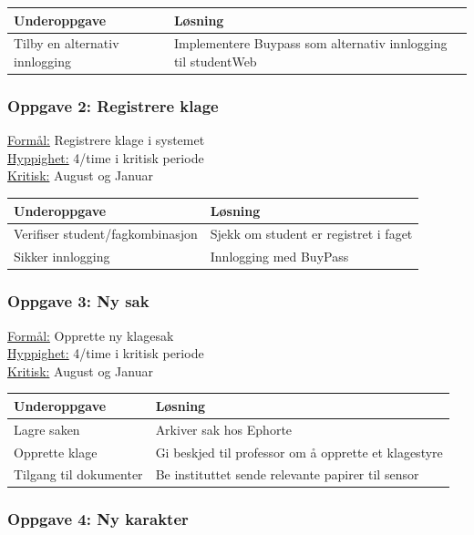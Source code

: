 \documentclass[12pt]{article}
\begin{document}
\begin{tabularx}{\textwidth}{|l|X|}
  \hline
  Underoppgave & Løsning \\ \hline
  Tilby en alternativ innlogging & Implementere Buypass som alternativ innlogging til studentWeb \\ \hline
\end{tabularx}

\subsubsection*{Oppgave 2: Registrere klage}

\underline{Formål:} Registrere klage i systemet\\
\underline{Hyppighet:} 4/time i kritisk periode\\
\underline{Kritisk:} August og Januar

\begin{tabularx}{\textwidth}{|l|X|}
  \hline
  Underoppgave & Løsning \\ \hline
  Verifiser student/fagkombinasjon & Sjekk om student er registret i faget \\ \hline
  Sikker innlogging & Innlogging med BuyPass \\ \hline
\end{tabularx}


\subsubsection*{Oppgave 3: Ny sak}

\underline{Formål:} Opprette ny klagesak\\
\underline{Hyppighet:} 4/time i kritisk periode\\
\underline{Kritisk:} August og Januar

\begin{tabularx}{\textwidth}{|l|X|}
  \hline
  Underoppgave & Løsning \\ \hline
  Lagre saken & Arkiver sak hos Ephorte \\ \hline
  Opprette klage & Gi beskjed til professor om å opprette et klagestyre \\ \hline
  Tilgang til dokumenter & Be instituttet sende relevante papirer til sensor \\ \hline
\end{tabularx}

\subsubsection*{Oppgave 4: Ny karakter}
\end{document}
